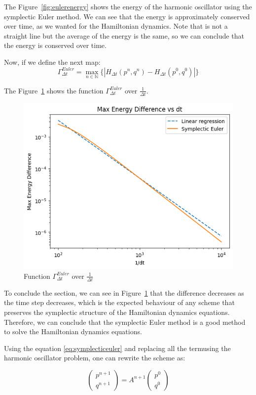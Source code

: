 \documentclass{article}
\begin{document}
The Figure~\ref{fig:eulerenergy} shows the energy of the harmonic oscillator using the symplectic Euler method. We can see that the energy is approximately conserved over time, as we wanted for the Hamiltonian dynamics. Note that is not a straight line but the average of the energy is the same, so we can conclude that the energy is conserved over time.

Now, if we define the next map:
\[
	\Gamma_{\Delta t}^{Euler} = \max_{n \in \mathbb{N}}\{|H_{\Delta t}(p^n, q^n) - H_{\Delta t}(p^0, q^0)|\}
\]

The Figure~\ref*{fig:eulermaxenergy} shows the function \(\Gamma_{\Delta t}^{Euler}\) over \(\frac{1}{\Delta t}\).

\begin{figure}[H]
	\centering
	\includegraphics[width=0.5\linewidth]{./Figures/Sympletic/eulermaxenergy.png}
	\caption{Function \(\Gamma_{\Delta t}^{Euler}\) over \(\frac{1}{\Delta t}\)}
	\label{fig:eulermaxenergy}
\end{figure}

To conclude the section, we can see in Figure~\ref*{fig:eulermaxenergy} that the difference decreases as the time step decreases, which is the expected behaviour of any scheme that preserves the symplectic structure of the Hamiltonian dynamics equations. Therefore, we can conclude that the symplectic Euler method is a good method to solve the Hamiltonian dynamics equations.

\label{sec:linear_stability_symplectic_euler}

Using the equation \ref{eq:symplecticeuler} and replacing all the termusing the harmonic oscillator problem, one can rewrite the scheme as:

\[
	\begin{pmatrix} p^{n+1} \\ q^{n+1} \end{pmatrix} = A^{n+1} \begin{pmatrix} p^{0} \\ q^{0} \end{pmatrix}
\]
\end{document}
